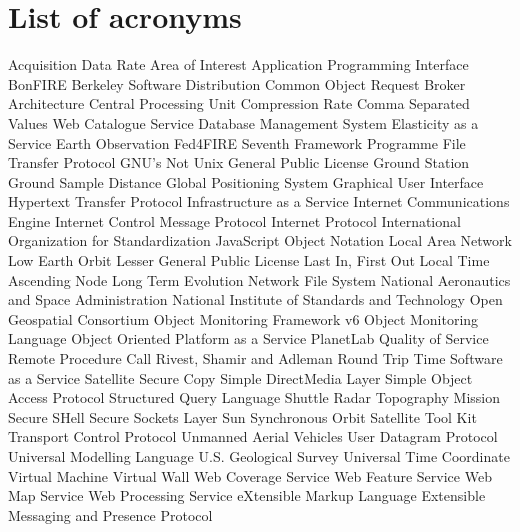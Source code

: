 \chapter{List of acronyms}

{\small
\begin{acronym}[XXXXXXXX]
     {Acquisition Data Rate}
      {Area of Interest}
   {Application Programming Interface}
       {BonFIRE}
   {Berkeley Software Distribution}
   {Common Object Request Broker Architecture}
     {Central Processing Unit}
      {Compression Rate}
     {Comma Separated Values}
       {Web Catalogue Service}
    {Database Management System}
    {Elasticity as a Service}
   {Earth Observation}
       {Fed4FIRE}
   {Seventh Framework Programme}
     {File Transfer Protocol}
       {\acs{GNU}'s Not Unix}
   {General Public License}
      {Ground Station}
   {Ground Sample Distance}
   {Global Positioning System}
   {Graphical User Interface}
    {Hypertext Transfer Protocol}
   {Infrastructure as a Service}
   {Internet Communications Engine}
   {Internet Control Message Protocol}
   {Internet Protocol}
   {International Organization for Standardization}
   {JavaScript Object Notation}
   {Local Area Network}
   {Low Earth Orbit}
   {Lesser General Public License}
    {Last In, First Out}
   {Local Time Ascending Node}
   {Long Term Evolution}
   {Network File System}
   {National Aeronautics and Space Administration}
   {National Institute of Standards and Technology}
   {Open Geospatial Consortium}
   {Object Monitoring Framework v6}
   {Object Monitoring Language}
        {Object Oriented}
   {Platform as a Service}
      {PlanetLab}
   {Quality of Service}
       {Remote Procedure Call}
   {Rivest, Shamir and Adleman}
   {Round Trip Time}
   {Software as a Service}
     {Satellite}
   {Secure Copy}
   {Simple DirectMedia Layer}
   {Simple Object Access Protocol}
     {Structured Query Language}
   {Shuttle Radar Topography Mission}
   {Secure SHell}
   {Secure Sockets Layer}
   {Sun Synchronous Orbit}
     {Satellite Tool Kit}
   {Transport Control Protocol}
   {Unmanned Aerial Vehicles}
   {User Datagram Protocol}
     {Universal Modelling Language}
   {U.S. Geological Survey}
     {Universal Time Coordinate}
      {Virtual Machine}
      {Virtual Wall}
   {Web Coverage Service}
   {Web Feature Service}
   {Web Map Service}
   {Web Processing Service}
      {eXtensible Markup Language}
   {Extensible Messaging and Presence Protocol}
\end{acronym}
}


